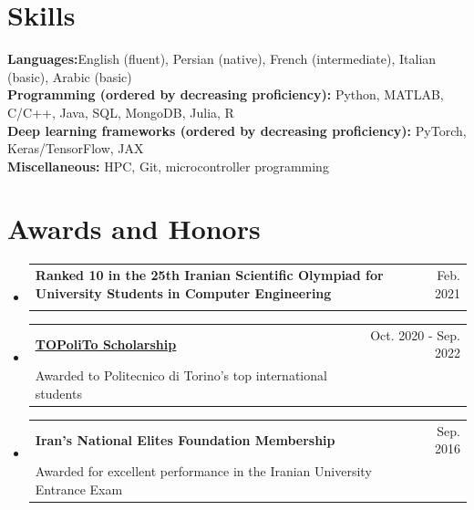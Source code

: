 \documentclass[A4,11pt]{article}
\makeatletter
\newcommand{\CVItem}[1]{
  \item\small{
    {#1 \vspace{-2pt}}
  }
}
\newcommand{\CVSubheading}[4]{
  \vspace{-2pt}\item
    \begin{tabular*}{0.97\textwidth}[t]{l@{\extracolsep{\fill}}r}
      \textbf{#1} & #2 \\
      \small#3 & \small #4 \\
    \end{tabular*}\vspace{-7pt}
}
\newcommand{\CVSubHeadingListStart}{\begin{itemize}[leftmargin=0.5cm, label={}]}
\newcommand{\CVSubHeadingListEnd}{\end{itemize}}
\newcommand{\CVItemListStart}{\begin{itemize}}
\newcommand{\CVItemListEnd}{\end{itemize}\vspace{-5pt}}
\makeatother
\begin{document}



\section{Skills}
 \begin{itemize}[leftmargin=0.5cm, label={}]
    \small{\item{
     \textbf{Languages:}{English (fluent), Persian (native), French (intermediate), Italian (basic), Arabic (basic)} \\
     \textbf{Programming (ordered by decreasing proficiency): }{Python, MATLAB, C/C++, Java, SQL, MongoDB, Julia, R} \\
     \textbf{Deep learning frameworks (ordered by decreasing proficiency): }{PyTorch, Keras/TensorFlow, JAX} \\
     \textbf{Miscellaneous: }{HPC, Git, microcontroller programming} \\
    }}
 \end{itemize}
    


\section{Awards and Honors}
  \CVSubHeadingListStart
     \CVSubheading
      {\small{Ranked 10 in the 25th Iranian Scientific Olympiad for University Students in Computer Engineering}}{\small{Feb. 2021}}{}{}
      \CVSubheading
      {\href{https://international.polito.it/financial_aid/topolito_scholarships}{\underline{\small{TOPoliTo Scholarship}}}}{\small{Oct. 2020 - Sep. 2022}}
      {\small{Awarded to Politecnico di Torino's top international students}}{}
      \CVSubheading
      {\small{Iran's National Elites Foundation Membership}}{\small{Sep. 2016}}
      {\small{Awarded for excellent performance in the Iranian University Entrance Exam}}{}
  \CVSubHeadingListEnd    
    
\end{document}
